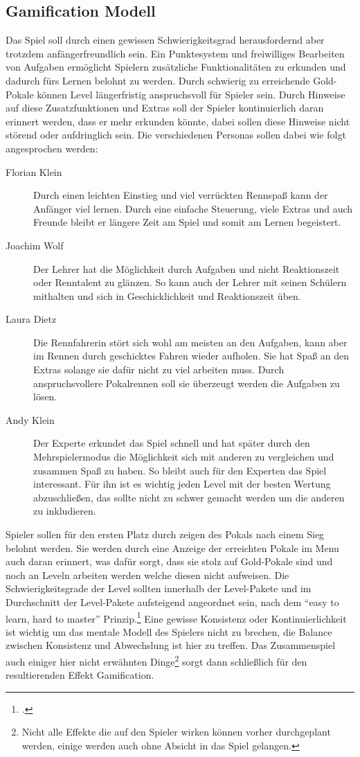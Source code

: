 \subsection{Gamification Modell}\label{ssec:gamification-modell}
	Das Spiel soll durch einen gewissen Schwierigkeitsgrad herausfordernd aber trotzdem anfängerfreundlich sein. Ein Punktesystem und freiwilliges Bearbeiten von Aufgaben ermöglicht Spielern zusätzliche Funktionalitäten zu erkunden und dadurch fürs Lernen belohnt zu werden. Durch schwierig zu erreichende Gold-Pokale können Level längerfristig anspruchsvoll für Spieler sein.
	Durch Hinweise auf diese Zusatzfunktionen und Extras soll der Spieler kontinuierlich daran erinnert werden, dass er mehr erkunden könnte, dabei sollen diese Hinweise nicht störend oder aufdringlich sein.
	Die verschiedenen Personas sollen dabei wie folgt angesprochen werden:
	\begin{description}
		\item[Florian Klein]{
			Durch einen leichten Einstieg und viel verrückten Rennspaß kann der Anfänger viel lernen. Durch eine einfache Steuerung, viele Extras und auch Freunde bleibt er längere Zeit am Spiel und somit am Lernen begeistert.
		}
		\item[Joachim Wolf]{
			Der Lehrer hat die Möglichkeit durch Aufgaben und nicht Reaktionszeit oder Renntalent zu glänzen. So kann auch der Lehrer mit seinen Schülern mithalten und sich in Geschicklichkeit und Reaktionszeit üben.
		}
		\item[Laura Dietz]{
			Die Rennfahrerin stört sich wohl am meisten an den Aufgaben, kann aber im Rennen durch geschicktes Fahren wieder aufholen. Sie hat Spaß an den Extras solange sie dafür nicht zu viel arbeiten muss.
			Durch anspruchsvollere Pokalrennen soll sie überzeugt werden die Aufgaben zu lösen.
		}
		\item[Andy Klein]{
			Der Experte erkundet das Spiel schnell und hat später durch den Mehrspielermodus die Möglichkeit sich mit anderen zu vergleichen und zusammen Spaß zu haben. So bleibt auch für den Experten das Spiel interessant.
			Für ihn ist es wichtig jeden Level mit der besten Wertung abzuschließen, das sollte nicht zu schwer gemacht werden um die anderen zu inkludieren.
		}
	\end{description}
	Spieler sollen für den ersten Platz durch zeigen des Pokals nach einem Sieg belohnt werden. Sie werden durch eine Anzeige der erreichten Pokale im Menu auch daran erinnert, was dafür sorgt, dass sie stolz auf Gold-Pokale sind und noch an Leveln arbeiten werden welche diesen nicht aufweisen.
	Die Schwierigkeitsgrade der Level sollten innerhalb der Level-Pakete und im Durchschnitt der Level-Pakete aufsteigend angeordnet sein, nach dem \enquote{easy to learn, hard to master} Prinzip.\footcite[Bushnell's Law]{easy-to-learn-hard-to-master} Eine gewisse Konsistenz oder Kontinuierlichkeit ist wichtig um das mentale Modell des Spielers nicht zu brechen, die Balance zwischen Konsistenz und Abwechslung ist hier zu treffen.
	Das Zusammenspiel auch einiger hier nicht erwähnten Dinge\footnote{Nicht alle Effekte die auf den Spieler wirken können vorher durchgeplant werden, einige werden auch ohne Absicht in das Spiel gelangen.} sorgt dann schließlich für den resultierenden Effekt Gamification.


